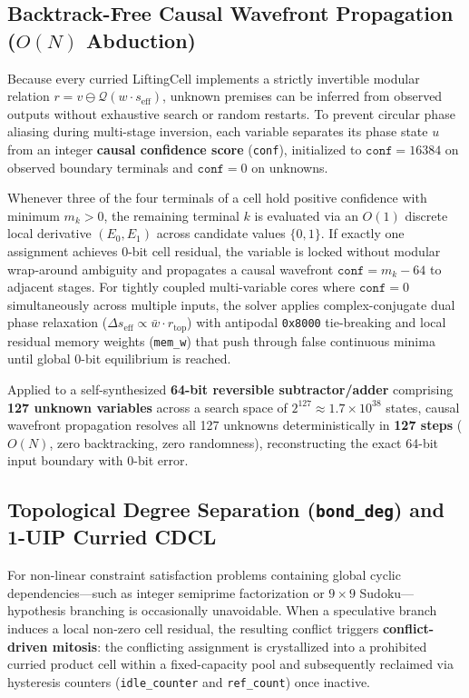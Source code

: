 \documentclass[11pt, a4paper]{article}
\begin{document}
\subsection{Backtrack-Free Causal Wavefront Propagation ($O(N)$ Abduction)}
Because every curried LiftingCell implements a strictly invertible modular relation $r = v \ominus \mathcal{Q}(w \cdot s_{\mathrm{eff}})$, unknown premises can be inferred from observed outputs without exhaustive search or random restarts. To prevent circular phase aliasing during multi-stage inversion, each variable separates its phase state $u$ from an integer \textbf{causal confidence score} (\texttt{conf}), initialized to $\texttt{conf} = 16384$ on observed boundary terminals and $\texttt{conf} = 0$ on unknowns.

Whenever three of the four terminals of a cell hold positive confidence with minimum $m_k > 0$, the remaining terminal $k$ is evaluated via an $O(1)$ discrete local derivative $(E_0, E_1)$ across candidate values $\{0, 1\}$. If exactly one assignment achieves 0-bit cell residual, the variable is locked without modular wrap-around ambiguity and propagates a causal wavefront $\texttt{conf} = m_k - 64$ to adjacent stages. For tightly coupled multi-variable cores where $\texttt{conf} = 0$ simultaneously across multiple inputs, the solver applies complex-conjugate dual phase relaxation ($\Delta s_{\mathrm{eff}} \propto \bar{w} \cdot r_{\mathrm{top}}$) with antipodal \texttt{0x8000} tie-breaking and local residual memory weights (\texttt{mem\_w}) that push through false continuous minima until global 0-bit equilibrium is reached.

Applied to a self-synthesized \textbf{64-bit reversible subtractor/adder} comprising \textbf{127 unknown variables} across a search space of $2^{127} \approx 1.7 \times 10^{38}$ states, causal wavefront propagation resolves all 127 unknowns deterministically in \textbf{127 steps} ($O(N)$, zero backtracking, zero randomness), reconstructing the exact 64-bit input boundary with 0-bit error.

\subsection{Topological Degree Separation (\texttt{bond\_deg}) and 1-UIP Curried CDCL}
For non-linear constraint satisfaction problems containing global cyclic dependencies---such as integer semiprime factorization or $9 \times 9$ Sudoku---hypothesis branching is occasionally unavoidable. When a speculative branch induces a local non-zero cell residual, the resulting conflict triggers \textbf{conflict-driven mitosis}: the conflicting assignment is crystallized into a prohibited curried product cell within a fixed-capacity pool and subsequently reclaimed via hysteresis counters (\texttt{idle\_counter} and \texttt{ref\_count}) once inactive.
\end{document}
